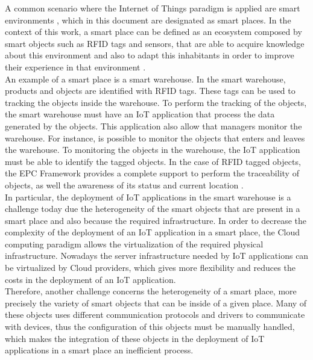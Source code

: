 A common scenario where the Internet of Things paradigm is applied are smart environments \cite{atzori2010internet},
which in this document are designated as smart places. In the context of this work,
a smart place can be defined as an ecosystem composed by smart objects such as RFID
tags and sensors, that are able to acquire knowledge about this environment and also to
adapt this inhabitants in order to improve their experience in that environment \cite{cook2004smart}.\\

An example of a smart place is a smart warehouse. In the smart warehouse, products and objects
are identified with RFID tags. These tags can be used to tracking the objects inside the warehouse.
To perform the tracking of the objects, the smart warehouse must have an IoT application that process
the data generated by the objects. This application also allow that managers monitor the warehouse.
For instance, is possible to monitor the objects that enters and leaves the warehouse.
To monitoring the objects in the warehouse, the IoT application must be able to identify
the tagged objects. In the case of RFID tagged objects, the EPC Framework provides a complete
support to perform the traceability of objects, as well the awareness of its status and
current location \cite{atzori2010internet}.\\

In particular, the deployment of IoT applications in the smart warehouse is a challenge today
due the heterogeneity of the smart objects that are present in a smart place and also
because the required infrastructure. In order to decrease the complexity of the deployment
of an IoT application in a smart place, the Cloud computing paradigm allows the virtualization
of the required physical infrastructure. Nowadays the server infrastructure needed by IoT
applications can be virtualized by Cloud providers, which gives more flexibility and reduces
the costs in the deployment of an IoT application.\\

Therefore, another challenge concerns the heterogeneity of a smart place, more precisely the variety of
smart objects that can be inside of a given place. Many of these objects uses different communication
protocols and drivers to communicate with devices, thus the configuration of this objects
must be manually handled, which makes the integration of these objects in the deployment of
IoT applications in a smart place an inefficient process.\\
